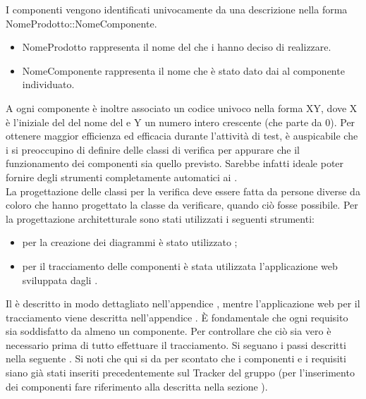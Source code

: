 				 \label{sec:ClassificareComponenti}
					I componenti vengono identificati univocamente da una descrizione nella forma NomeProdotto::NomeComponente.
					\begin{itemize}
						\item NomeProdotto rappresenta il nome del   che i  hanno deciso di realizzare.
						\item NomeComponente rappresenta il nome che è stato dato dai  al componente individuato.
					\end{itemize}
					A ogni componente è inoltre associato un codice univoco nella forma XY, dove X è l'iniziale del del nome del  e Y un numero intero crescente (che parte da 0).
				 \label{sec:TestIntegrazione}
					Per ottenere maggior efficienza ed efficacia durante l'attività di test, è auspicabile che i  si preoccupino di definire delle classi di verifica per appurare che il funzionamento dei componenti sia quello previsto. Sarebbe infatti ideale poter fornire degli strumenti completamente automatici ai .\\
					La progettazione delle classi per la verifica deve essere fatta da persone diverse da coloro che hanno progettato la classe da verificare, quando ciò fosse possibile.
				Per la progettazione architetturale sono stati utilizzati i seguenti strumenti:
				\begin{itemize}
					\item per la creazione dei diagrammi  è stato utilizzato ;
					\item per il tracciamento delle componenti è stata utilizzata l'applicazione web sviluppata dagli .
				\end{itemize}
				Il   è descritto in modo dettagliato nell'appendice , mentre l'applicazione web per il tracciamento viene descritta nell'appendice .
				 \label{sec:ProgTracCompReq}
					È fondamentale che ogni requisito sia soddisfatto da almeno un componente. Per controllare che ciò sia vero è necessario prima di tutto effettuare il tracciamento. Si seguano i passi descritti nella seguente . Si noti che qui si da per scontato che i componenti e i requisiti siano già stati inseriti precedentemente sul Tracker del gruppo (per l'inserimento dei componenti fare riferimento alla  descritta nella sezione ).
